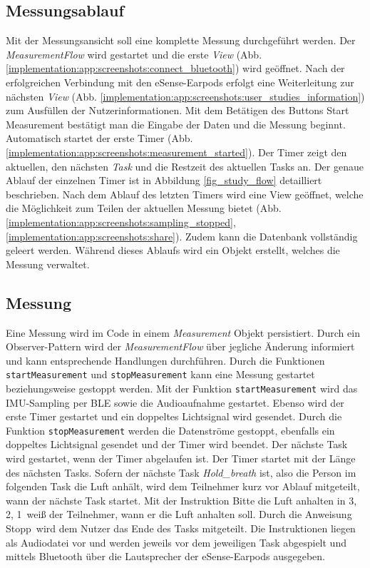 \newpage
\subsection{Messungsablauf}
\label{ch:Implementierung:app:measurement_procedure}
Mit der Messungsansicht soll eine komplette Messung durchgeführt werden.
Der \textit{MeasurementFlow} wird gestartet und die erste \textit{View} (Abb. \ref{implementation:app:screenshots:connect_bluetooth}) wird geöffnet.
Nach der erfolgreichen Verbindung mit den eSense-Earpods erfolgt eine Weiterleitung zur nächsten \textit{View} (Abb. \ref{implementation:app:screenshots:user_studies_information}) zum Ausfüllen der Nutzerinformationen. 
Mit dem Betätigen des Buttons {\glqq Start Measurement\grqq} bestätigt man die Eingabe der Daten und die Messung beginnt.
Automatisch startet der erste Timer (Abb. \ref{implementation:app:screenshots:measurement_started}).
Der Timer zeigt den aktuellen, den nächsten \textit{Task} und die Restzeit des aktuellen Tasks an.
Der genaue Ablauf der einzelnen Timer ist in Abbildung \ref{fig_study_flow} detailliert beschrieben.
Nach dem Ablauf des letzten Timers wird eine View geöffnet, welche die Möglichkeit zum Teilen der aktuellen Messung bietet (Abb. \ref{implementation:app:screenshots:sampling_stopped}, \ref{implementation:app:screenshots:share}).
Zudem kann die Datenbank vollständig geleert werden.
Während dieses Ablaufs wird ein Objekt erstellt, welches die Messung verwaltet.

\subsection{Messung}
\label{ch:Implementierung:app:measurement}
Eine Messung wird im Code in einem \textit{Measurement} Objekt persistiert.
Durch ein Observer-Pattern wird der \textit{MeasurementFlow} über jegliche Änderung informiert und kann entsprechende Handlungen durchführen.
Durch die Funktionen \texttt{startMeasurement} und \texttt{stopMeasurement} kann eine Messung gestartet beziehungsweise gestoppt werden.
Mit der Funktion \texttt{startMeasurement} wird das IMU-Sampling per BLE sowie die Audioaufnahme gestartet. 
Ebenso wird der erste Timer gestartet und ein doppeltes Lichtsignal wird gesendet. 
Durch die Funktion \texttt{stopMeasurement} werden die Datenströme gestoppt, ebenfalls ein doppeltes Lichtsignal gesendet und der Timer wird beendet.
Der nächste Task wird gestartet, wenn der Timer abgelaufen ist. Der Timer startet mit der Länge des nächsten Tasks.
Sofern der nächste Task {\glqq \textit{Hold\_breath}\grqq} ist, also die Person im folgenden Task die Luft anhält, wird dem Teilnehmer kurz vor Ablauf mitgeteilt, wann der nächste Task startet.
Mit der Instruktion \glqq Bitte die Luft anhalten in 3, 2, 1\grqq \ weiß der Teilnehmer, wann er die Luft anhalten soll.
Durch die Anweisung \glqq Stopp\grqq \ wird dem Nutzer das Ende des Tasks mitgeteilt. 
Die Instruktionen liegen als Audiodatei vor und werden jeweils vor dem jeweiligen Task abgespielt und mittels Bluetooth über die Lautsprecher der eSense-Earpods ausgegeben.

